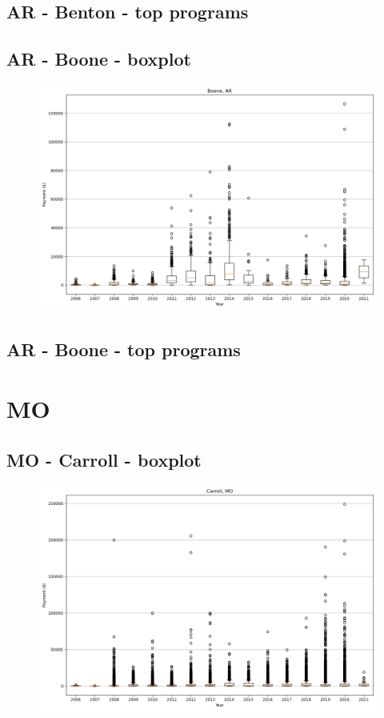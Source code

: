 \subsection*{AR - Benton - top programs}

\newpage
\subsection*{AR - Boone - boxplot}
\begin{figure}[h]
\centering
\includegraphics[width=7in]{../output/boxplots/counties/Boone-AR_boxplot.png}
\end{figure}


\subsection*{AR - Boone - top programs}

\newpage
\section*{MO}
\subsection*{MO - Carroll - boxplot}
\begin{figure}[h]
\centering
\includegraphics[width=7in]{../output/boxplots/counties/Carroll-MO_boxplot.png}
\end{figure}


